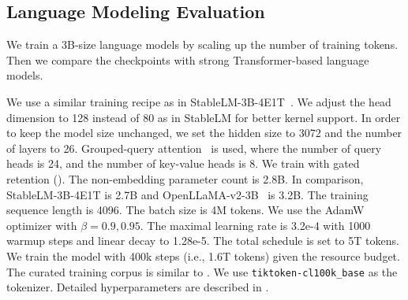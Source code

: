 \subsection{Language Modeling Evaluation}
\label{sec:lm:3b}

We train a 3B-size \our{} language models by scaling up the number of training tokens. Then we compare the checkpoints with strong Transformer-based language models.

We use a similar training recipe as in StableLM-3B-4E1T~\cite{stablelm}.
We adjust the head dimension to 128 instead of 80 as in StableLM for better kernel support.
In order to keep the model size unchanged, we set the hidden size to 3072 and the number of layers to 26.
Grouped-query attention~\cite{gqa} is used, where the number of query heads is 24, and the number of key-value heads is 8.
We train \our{} with gated retention ().
The non-embedding parameter count is 2.8B. In comparison, StableLM-3B-4E1T is 2.7B and OpenLLaMA-v2-3B~\cite{openllama} is 3.2B.
The training sequence length is 4096.
The batch size is 4M tokens.
We use the AdamW~\cite{adamw} optimizer with $\beta=0.9,0.95$.
The maximal learning rate is 3.2e-4 with 1000 warmup steps and linear decay to 1.28e-5.
The total schedule is set to 5T tokens. We train the model with 400k steps (i.e., 1.6T tokens) given the resource budget.
The curated training corpus is similar to \cite{stablelm}.
We use \texttt{tiktoken-cl100k\_base} as the tokenizer.
Detailed hyperparameters are described in .

